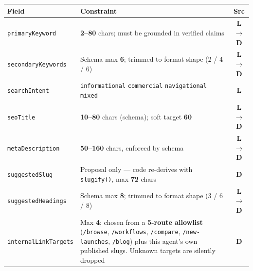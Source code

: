 \documentclass[10pt,a4paper]{article}
\newcommand{\cd}[1]{\texttt{\footnotesize\hyphenpenalty=0\exhyphenpenalty=0\relax #1}}
\newcommand{\D}{\textcolor{go}{\textbf{D}}}
\newcommand{\Lm}{\textcolor{ac}{\textbf{L}}}
\newcommand{\LD}{\textcolor{hd}{\textbf{L$\rightarrow$D}}}
\begin{document}
\begin{center}\footnotesize
\begin{tabularx}{\textwidth}{@{}l >{\RaggedRight}X c@{}}
\toprule
\textbf{Field} & \textbf{Constraint} & \textbf{Src} \\
\midrule
\cd{primaryKeyword} & \textbf{2--80} chars; must be grounded in verified claims & \LD \\
\cd{secondaryKeywords} & Schema max \textbf{6}; trimmed to format shape (2 / 4 / 6) & \LD \\
\cd{searchIntent} & \cd{informational} \textbar{} \cd{commercial} \textbar{} \cd{navigational} \textbar{} \cd{mixed} & \Lm \\
\cd{seoTitle} & \textbf{10--80} chars (schema); soft target \textbf{60} & \LD \\
\cd{metaDescription} & \textbf{50--160} chars, enforced by schema & \LD \\
\cd{suggestedSlug} & Proposal only --- code re-derives with \cd{slugify()}, max \textbf{72} chars & \D \\
\cd{suggestedHeadings} & Schema max \textbf{8}; trimmed to format shape (3 / 6 / 8) & \LD \\
\cd{internalLinkTargets} & Max \textbf{4}; chosen from a \textbf{5-route allowlist} (\cd{/browse}, \cd{/workflows}, \cd{/compare}, \cd{/new-launches}, \cd{/blog}) plus this agent's own published slugs. Unknown targets are silently dropped & \D \\
\bottomrule
\end{tabularx}
\end{center}
\end{document}
